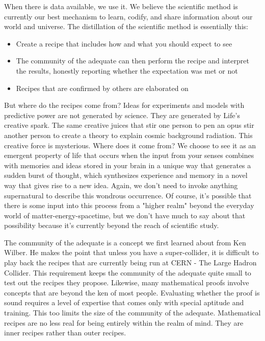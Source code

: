 \documentclass[ebook,11pt,openany,twoside]{memoir}
\begin{document}
When there is data available, we use it. We believe the scientific method is
currently our best mechanism to learn, codify, and share information about our
world and universe. The distillation of the scientific method is essentially
this:
\begin{itemize}[\textbullet]
\item Create a recipe that includes how and what you should expect to see

\item The community of the adequate can then perform the recipe and interpret
the results, honestly reporting whether the expectation was met or not

\item Recipes that are confirmed by others are elaborated on
\end{itemize}

But where do the recipes come from? Ideas for experiments and models with
predictive power are not generated by science. They are generated by Life's
creative spark. The same creative juices that stir one person to pen an opus
stir another person to create a theory to explain cosmic background radiation.
This creative force is mysterious. Where does it come from? We choose to see it
as an emergent property of life that occurs when the input from your senses
combines with memories and ideas stored in your brain in a unique way that
generates a sudden burst of thought, which synthesizes experience and memory in
a novel way that gives rise to a new idea. Again, we don't need to invoke
anything supernatural to describe this wondrous occurrence. Of course, it's
possible that there is some input into this process from a "higher realm"
beyond the everyday world of matter-energy-spacetime, but we don't have much to
say about that possibility because it's currently beyond the reach of
scientific study.

The community of the adequate is a concept we first learned about from Ken
Wilber. He makes the point that unless you have a super-collider, it is
difficult to play back the recipes that are currently being run at CERN - The
Large Hadron Collider. This requirement keeps the community of the adequate
quite small to test out the recipes they propose. Likewise, many mathematical
proofs involve concepts that are beyond the ken of most people. Evaluating
whether the proof is sound requires a level of expertise that comes only with
special aptitude and training. This too limits the size of the community of the
adequate. Mathematical recipes are no less real for being entirely within the
realm of mind. They are inner recipes rather than outer recipes.
\end{document}
